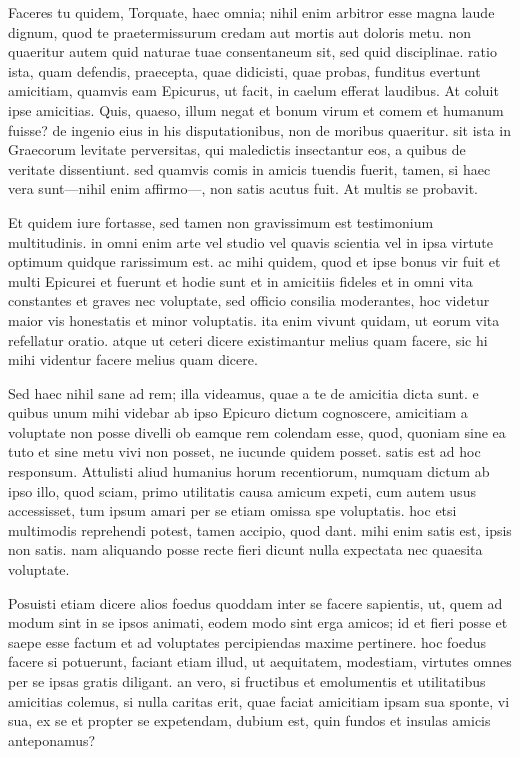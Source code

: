  Faceres tu quidem, Torquate, haec omnia; nihil enim arbitror esse magna laude dignum, quod te praetermissurum credam aut mortis aut doloris metu. non quaeritur autem quid naturae tuae consentaneum sit, sed quid disciplinae. ratio ista, quam defendis, praecepta, quae didicisti, quae probas, funditus evertunt amicitiam, quamvis eam Epicurus, ut facit, in caelum efferat laudibus. At coluit ipse amicitias. Quis, quaeso, illum negat et bonum virum et comem et humanum fuisse? de ingenio eius in his disputationibus, non de moribus quaeritur. sit ista in Graecorum levitate perversitas, qui maledictis insectantur eos, a quibus de veritate dissentiunt. sed quamvis comis in amicis tuendis fuerit, tamen, si haec vera sunt—nihil enim affirmo—, non satis acutus fuit. At multis se probavit.

 Et quidem iure fortasse, sed tamen non gravissimum est testimonium multitudinis. in omni enim arte vel studio vel quavis scientia vel in ipsa virtute optimum quidque rarissimum est. ac mihi quidem, quod et ipse bonus vir fuit et multi Epicurei et fuerunt et hodie sunt et in amicitiis fideles et in omni vita constantes et graves nec voluptate, sed officio consilia moderantes, hoc videtur maior vis honestatis et minor voluptatis. ita enim vivunt quidam, ut eorum vita refellatur oratio. atque ut ceteri dicere existimantur melius quam facere, sic hi mihi videntur facere melius quam dicere.

 Sed haec nihil sane ad rem; illa videamus, quae a te de amicitia dicta sunt. e quibus unum mihi videbar ab ipso Epicuro dictum cognoscere, amicitiam a voluptate non posse divelli ob eamque rem colendam esse, quod, quoniam sine ea tuto et sine metu vivi non posset, ne iucunde quidem posset. satis est ad hoc responsum. Attulisti aliud humanius horum recentiorum, numquam dictum ab ipso illo, quod sciam, primo utilitatis causa amicum expeti, cum autem usus accessisset, tum ipsum amari per se etiam omissa spe voluptatis. hoc etsi multimodis reprehendi potest, tamen accipio, quod dant. mihi enim satis est, ipsis non satis. nam aliquando posse recte fieri dicunt nulla expectata nec quaesita voluptate.

 Posuisti etiam dicere alios foedus quoddam inter se facere sapientis, ut, quem ad modum sint in se ipsos animati, eodem modo sint erga amicos; id et fieri posse et saepe esse factum et ad voluptates percipiendas maxime pertinere. hoc foedus facere si potuerunt, faciant etiam illud, ut aequitatem, modestiam, virtutes omnes per se ipsas gratis diligant. an vero, si fructibus et emolumentis et utilitatibus amicitias colemus, si nulla caritas erit, quae faciat amicitiam ipsam sua sponte, vi sua, ex se et propter se expetendam, dubium est, quin fundos et insulas amicis anteponamus?

